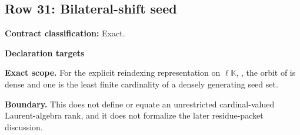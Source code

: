 \subsection{Row 31: Bilateral-shift seed}
\label{row:31}
\textbf{Contract classification:} Exact.
\par\smallskip\textbf{Declaration targets}\par
{\small\noindent{}\par}
{\small\noindent{}\par}
{\small\noindent{}\par}
\medskip\noindent\textbf{Exact scope.} For the explicit reindexing representation on \code{}\ensuremath{\ell}\ensuremath{\mathbb{K}}\code{)}, , the orbit of  is dense and one is the least finite cardinality of a densely generating seed set.
\par\smallskip\noindent\textbf{Boundary.} This does not define or equate an unrestricted cardinal-valued Laurent-algebra rank, and it does not formalize the later residue-packet discussion.
\medskip
